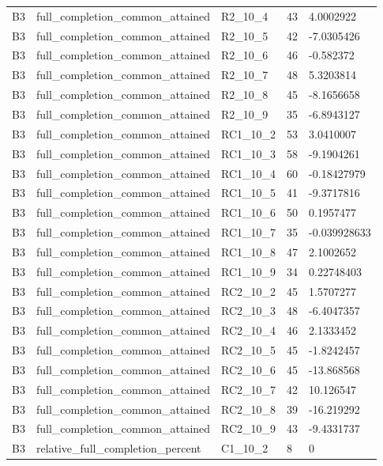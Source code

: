 \begin{longtable}{lllll}
B3 & full\_completion\_common\_attained & R2\_10\_4 & 43 & 4.0002922 \\
B3 & full\_completion\_common\_attained & R2\_10\_5 & 42 & -7.0305426 \\
B3 & full\_completion\_common\_attained & R2\_10\_6 & 46 & -0.582372 \\
B3 & full\_completion\_common\_attained & R2\_10\_7 & 48 & 5.3203814 \\
B3 & full\_completion\_common\_attained & R2\_10\_8 & 45 & -8.1656658 \\
B3 & full\_completion\_common\_attained & R2\_10\_9 & 35 & -6.8943127 \\
B3 & full\_completion\_common\_attained & RC1\_10\_2 & 53 & 3.0410007 \\
B3 & full\_completion\_common\_attained & RC1\_10\_3 & 58 & -9.1904261 \\
B3 & full\_completion\_common\_attained & RC1\_10\_4 & 60 & -0.18427979 \\
B3 & full\_completion\_common\_attained & RC1\_10\_5 & 41 & -9.3717816 \\
B3 & full\_completion\_common\_attained & RC1\_10\_6 & 50 & 0.1957477 \\
B3 & full\_completion\_common\_attained & RC1\_10\_7 & 35 & -0.039928633 \\
B3 & full\_completion\_common\_attained & RC1\_10\_8 & 47 & 2.1002652 \\
B3 & full\_completion\_common\_attained & RC1\_10\_9 & 34 & 0.22748403 \\
B3 & full\_completion\_common\_attained & RC2\_10\_2 & 45 & 1.5707277 \\
B3 & full\_completion\_common\_attained & RC2\_10\_3 & 48 & -6.4047357 \\
B3 & full\_completion\_common\_attained & RC2\_10\_4 & 46 & 2.1333452 \\
B3 & full\_completion\_common\_attained & RC2\_10\_5 & 45 & -1.8242457 \\
B3 & full\_completion\_common\_attained & RC2\_10\_6 & 45 & -13.868568 \\
B3 & full\_completion\_common\_attained & RC2\_10\_7 & 42 & 10.126547 \\
B3 & full\_completion\_common\_attained & RC2\_10\_8 & 39 & -16.219292 \\
B3 & full\_completion\_common\_attained & RC2\_10\_9 & 43 & -9.4331737 \\
B3 & relative\_full\_completion\_percent & C1\_10\_2 & 8 & 0 \\

\end{longtable}
